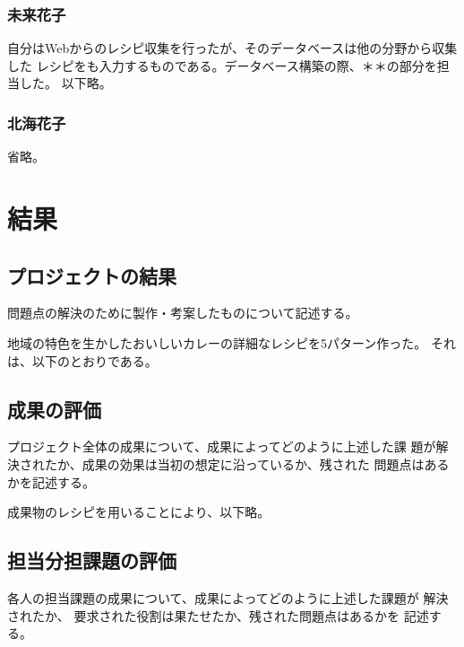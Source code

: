 \documentclass[openany,11pt,papersize]{jsbook}
\begin{document}
\subsection{未来花子}
自分はWebからのレシピ収集を行ったが、そのデータベースは他の分野から収集した 
レシピをも入力するものである。データベース構築の際、＊＊の部分を担当した。
以下略。

\subsection{北海花子}
省略。



\chapter{結果}

\section{プロジェクトの結果}
\begin{hissu}
問題点の解決のために製作・考案したものについて記述する。
\end{hissu}
地域の特色を生かしたおいしいカレーの詳細なレシピを5パターン作った。 
それは、以下のとおりである。


\section{成果の評価}
\begin{hissu}
 プロジェクト全体の成果について、成果によってどのように上述した課
 題が解決されたか、成果の効果は当初の想定に沿っているか、残された
 問題点はあるかを記述する。
\end{hissu}

成果物のレシピを用いることにより、以下略。




\section{担当分担課題の評価}
\begin{hissu}
各人の担当課題の成果について、成果によってどのように上述した課題が
解決されたか、 要求された役割は果たせたか、残された問題点はあるかを
記述する。
\end{hissu}
\end{document}
